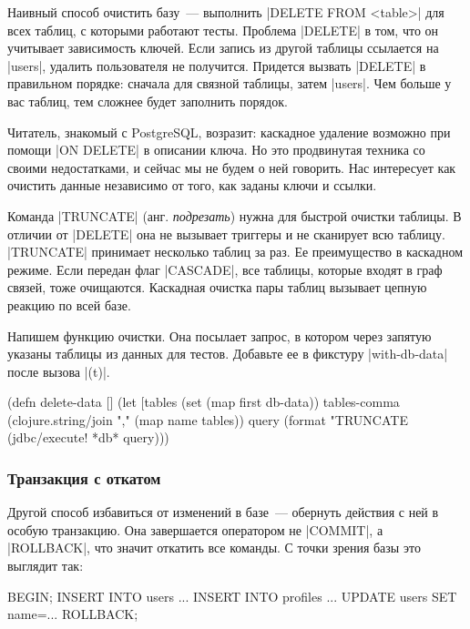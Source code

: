 Наивный способ очистить базу~--- выполнить \spverb|DELETE FROM <table>| для всех
таблиц, с которыми работают тесты. Проблема \spverb|DELETE| в том, что он
учитывает зависимость ключей. Если запись из другой таблицы ссылается на
\spverb|users|, удалить пользователя не получится. Придется вызвать
\spverb|DELETE| в правильном порядке: сначала для связной таблицы, затем
\spverb|users|. Чем больше у вас таблиц, тем сложнее будет заполнить порядок.

Читатель, знакомый с PostgreSQL, возразит: каскадное удаление возможно при
помощи \spverb|ON DELETE| в описании ключа. Но это продвинутая техника со своими
недостатками, и сейчас мы не будем о ней говорить. Нас интересует как очистить
данные независимо от того, как заданы ключи и ссылки.

Команда \spverb|TRUNCATE| (анг. \emph{подрезать}) нужна для быстрой очистки
таблицы. В отличии от \spverb|DELETE| она не вызывает триггеры и не сканирует
всю таблицу. \spverb|TRUNCATE| принимает несколько таблиц за раз. Ее
преимущество в каскадном режиме. Если передан флаг \spverb|CASCADE|, все
таблицы, которые входят в граф связей, тоже очищаются. Каскадная очистка пары
таблиц вызывает цепную реакцию по всей базе.

Напишем функцию очистки. Она посылает запрос, в котором через запятую указаны
таблицы из данных для тестов. Добавьте ее в фикстуру \spverb|with-db-data| после
вызова \spverb|(t)|.

\begin{english}
  \begin{clojure}
(defn delete-data []
  (let [tables (set (map first db-data))
        tables-comma (clojure.string/join "," (map name tables))
        query (format "TRUNCATE %
    (jdbc/execute! *db* query)))
  \end{clojure}
\end{english}

\subsubsection*{Транзакция с откатом}

Другой способ избавиться от изменений в базе~--- обернуть действия с ней в
особую транзакцию. Она завершается оператором не \spverb|COMMIT|, а
\spverb|ROLLBACK|, что значит откатить все команды. С точки зрения базы это
выглядит так:

\begin{english}
  \begin{sql}
BEGIN;
INSERT INTO users ...
INSERT INTO profiles ...
UPDATE users SET name=...
ROLLBACK;
  \end{sql}
\end{english}

